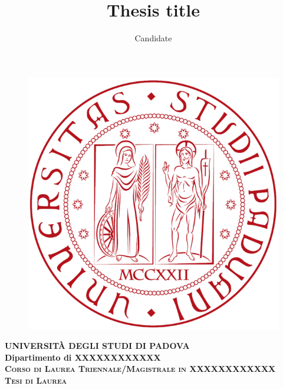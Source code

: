 \documentclass[a4paper,12pt]{memoir} %
\title{Thesis title}
\author{Candidate}
\date{\DTMdisplaydate\theyear\themonth\theday{}}
\begin{document}
  \frontmatter
  \begin{titlingpage} %
    \vspace{5mm}
    \begin{figure}[ht]
      \centering
      \includegraphics[scale=.13]{logo.png}
    \end{figure}
    \vspace{5mm}
    \begin{center}
      {{\Large{\textsc{\textbf{UNIVERSITÀ DEGLI STUDI DI PADOVA}}}}\\}
      \vspace{5mm}
      {\textbf{Dipartimento di XXXXXXXXXXXX}} \\ %
      \vspace{5mm}
      {\textsc{\textbf{Corso di Laurea Triennale/Magistrale in XXXXXXXXXXXX}}}\\ %
      \vspace{20mm}
      {\textsc{\textbf{Tesi di Laurea}}}\\ %
      \vspace{25mm}
      \begin{Spacing}{3}
        {\Large \textbf{\thetitle}}\\
      \end{Spacing}
      \vspace{8mm}
    \end{center}


\end{titlingpage}
\end{document}
